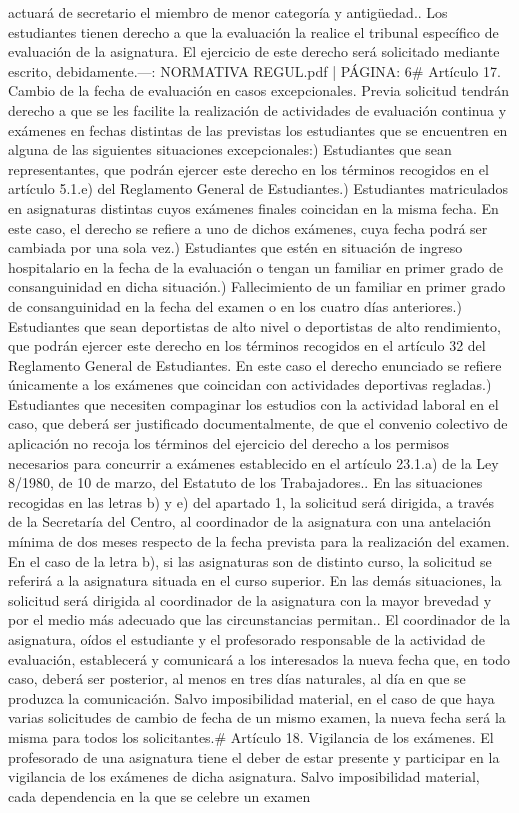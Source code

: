 \documentclass{article}
\begin{document}
\begin{itemize}
{{{{actuará de secretario el miembro de menor categoría y antigüedad.\n{}. Los estudiantes tienen derecho a que la evaluación la realice el tribunal específico de evaluación de la asignatura. El ejercicio de este derecho será solicitado mediante escrito, debidamente.\n\n---\n\nFUENTE: NORMATIVA REGUL.pdf | PÁGINA: 6\n# Artículo 17. Cambio de la fecha de evaluación en casos excepcionales\n{}. Previa solicitud tendrán derecho a que se les facilite la realización de actividades de evaluación continua y exámenes en fechas distintas de las previstas los estudiantes que se encuentren en alguna de las siguientes situaciones excepcionales:\na) Estudiantes que sean representantes, que podrán ejercer este derecho en los términos recogidos en el artículo 5.1.e) del Reglamento General de Estudiantes.\nb) Estudiantes matriculados en asignaturas distintas cuyos exámenes finales coincidan en la misma fecha. En este caso, el derecho se refiere a uno de dichos exámenes, cuya fecha podrá ser cambiada por una sola vez.\nc) Estudiantes que estén en situación de ingreso hospitalario en la fecha de la evaluación o tengan un familiar en primer grado de consanguinidad en dicha situación.\nd) Fallecimiento de un familiar en primer grado de consanguinidad en la fecha del examen o en los cuatro días anteriores.\ne) Estudiantes que sean deportistas de alto nivel o deportistas de alto rendimiento, que podrán ejercer este derecho en los términos recogidos en el artículo 32 del Reglamento General de Estudiantes. En este caso el derecho enunciado se refiere únicamente a los exámenes que coincidan con actividades deportivas regladas.\nf) Estudiantes que necesiten compaginar los estudios con la actividad laboral en el caso, que deberá ser justificado documentalmente, de que el convenio colectivo de aplicación no recoja los términos del ejercicio del derecho a los permisos necesarios para concurrir a exámenes establecido en el artículo 23.1.a) de la Ley 8/1980, de 10 de marzo, del Estatuto de los Trabajadores.\n{}. En las situaciones recogidas en las letras b) y e) del apartado 1, la solicitud será dirigida, a través de la Secretaría del Centro, al coordinador de la asignatura con una antelación mínima de dos meses respecto de la fecha prevista para la realización del examen. En el caso de la letra b), si las asignaturas son de distinto curso, la solicitud se referirá a la asignatura situada en el curso superior. En las demás situaciones, la solicitud será dirigida al coordinador de la asignatura con la mayor brevedad y por el medio más adecuado que las circunstancias permitan.\n{}. El coordinador de la asignatura, oídos el estudiante y el profesorado responsable de la actividad de evaluación, establecerá y comunicará a los interesados la nueva fecha que, en todo caso, deberá ser posterior, al menos en tres días naturales, al día en que se produzca la comunicación. Salvo imposibilidad material, en el caso de que haya varias solicitudes de cambio de fecha de un mismo examen, la nueva fecha será la misma para todos los solicitantes.\n\n# Artículo 18. Vigilancia de los exámenes\n{}. El profesorado de una asignatura tiene el deber de estar presente y participar en la vigilancia de los exámenes de dicha asignatura. Salvo imposibilidad material, cada dependencia en la que se celebre un examen }}}}
\end{itemize}
\end{document}
